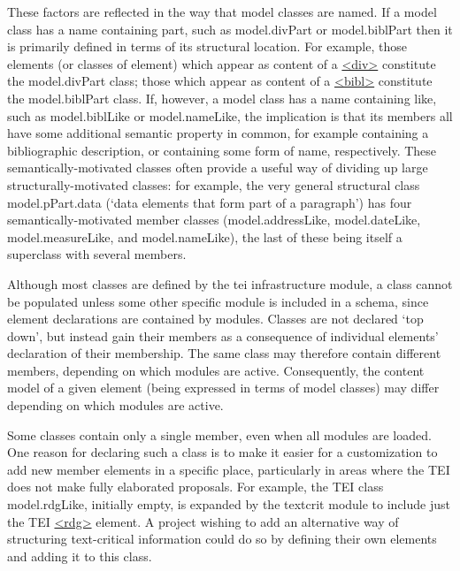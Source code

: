 These factors are reflected in the way that model classes are named. If a model class has a name containing part, such as \textsf{model.divPart} or \textsf{model.biblPart} then it is primarily defined in terms of its structural location. For example, those elements (or classes of element) which appear as content of a \hyperref[TEI.div]{<div>} constitute the \textsf{model.divPart} class; those which appear as content of a \hyperref[TEI.bibl]{<bibl>} constitute the \textsf{model.biblPart} class. If, however, a model class has a name containing like, such as \textsf{model.biblLike} or \textsf{model.nameLike}, the implication is that its members all have some additional semantic property in common, for example containing a bibliographic description, or containing some form of name, respectively. These semantically-motivated classes often provide a useful way of dividing up large structurally-motivated classes: for example, the very general structural class \textsf{model.pPart.data} (‘data elements that form part of a paragraph’) has four semantically-motivated member classes (\textsf{model.addressLike}, \textsf{model.dateLike}, \textsf{model.measureLike}, and \textsf{model.nameLike}), the last of these being itself a superclass with several members.\par
Although most classes are defined by the \textsf{tei} infrastructure module, a class cannot be populated unless some other specific module is included in a schema, since element declarations are contained by modules. Classes are not declared ‘top down’, but instead gain their members as a consequence of individual elements' declaration of their membership. The same class may therefore contain different members, depending on which modules are active. Consequently, the content model of a given element (being expressed in terms of model classes) may differ depending on which modules are active.\par
Some classes contain only a single member, even when all modules are loaded. One reason for declaring such a class is to make it easier for a customization to add new member elements in a specific place, particularly in areas where the TEI does not make fully elaborated proposals. For example, the TEI class \textsf{model.rdgLike}, initially empty, is expanded by the \textsf{textcrit} module to include just the TEI \hyperref[TEI.rdg]{<rdg>} element. A project wishing to add an alternative way of structuring text-critical information could do so by defining their own elements and adding it to this class.\par
